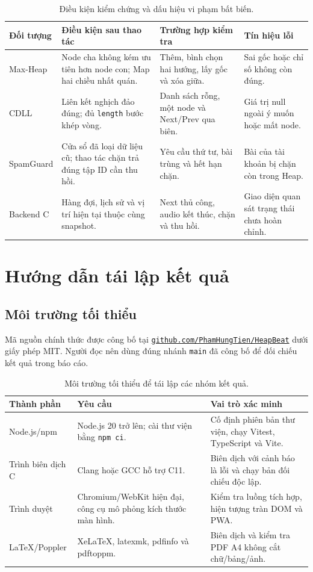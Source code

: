\documentclass[12pt,a4paper,twoside,openright]{report}
\newcommand{\code}[1]{\texttt{#1}}
\begin{document}
\begin{table}[h]\centering\small
\begin{tabularx}{\textwidth}{@{}p{2.35cm}p{4.65cm}Xp{2.45cm}@{}}
\toprule
\textbf{Đối tượng} & \textbf{Điều kiện sau thao tác} & \textbf{Trường hợp kiểm tra} &
\textbf{Tín hiệu lỗi}\\
\midrule
Max-Heap & Node cha không kém ưu tiên hơn node con; Map hai chiều nhất quán. & Thêm, bình
chọn hai hướng, lấy gốc và xóa giữa. & Sai gốc hoặc chỉ số không còn đúng.\\
CDLL & Liên kết nghịch đảo đúng; đủ \code{length} bước khép vòng. & Danh sách rỗng, một
node và Next/Prev qua biên. & Giá trị null ngoài ý muốn hoặc mất node.\\
SpamGuard & Cửa sổ đã loại dữ liệu cũ; thao tác chặn trả đúng tập ID cần thu hồi. & Yêu cầu
thứ tư, bài trùng và hết hạn chặn. & Bài của tài khoản bị chặn còn trong Heap.\\
Backend C & Hàng đợi, lịch sử và vị trí hiện tại thuộc cùng snapshot. & Next thủ công,
audio kết thúc, chặn và thu hồi. & Giao diện quan sát trạng thái chưa hoàn chỉnh.\\
\bottomrule
\end{tabularx}
\caption{Điều kiện kiểm chứng và dấu hiệu vi phạm bất biến.}
\label{tab:invariant-oracles}
\end{table}

\clearpage
\chapter{Hướng dẫn tái lập kết quả}
\section{Môi trường tối thiểu}
Mã nguồn chính thức được công bố tại
\href{https://github.com/PhamHungTien/HeapBeat}{\code{github.com/PhamHungTien/HeapBeat}}
dưới giấy phép MIT. Người đọc nên dùng đúng nhánh \code{main} đã công bố để
đối chiếu kết quả trong báo cáo.

\begin{table}[h]\centering\small
\begin{tabularx}{\textwidth}{@{}p{3.2cm}p{4cm}X@{}}
\toprule
\textbf{Thành phần} & \textbf{Yêu cầu} & \textbf{Vai trò xác minh}\\
\midrule
Node.js/npm & Node.js 20 trở lên; cài thư viện bằng \code{npm ci}. & Cố định phiên bản thư
viện, chạy Vitest, TypeScript và Vite.\\
Trình biên dịch C & Clang hoặc GCC hỗ trợ C11. & Biên dịch với cảnh báo là lỗi và chạy
bản đối chiếu độc lập.\\
Trình duyệt & Chromium/WebKit hiện đại, công cụ mô phỏng kích thước màn hình. & Kiểm tra
luồng tích hợp, hiện tượng tràn DOM và PWA.\\
LaTeX/Poppler & XeLaTeX, latexmk, pdfinfo và pdftoppm. & Biên dịch và kiểm tra PDF A4
không cắt chữ/bảng/ảnh.\\
\bottomrule
\end{tabularx}
\caption{Môi trường tối thiểu để tái lập các nhóm kết quả.}
\end{table}
\end{document}
